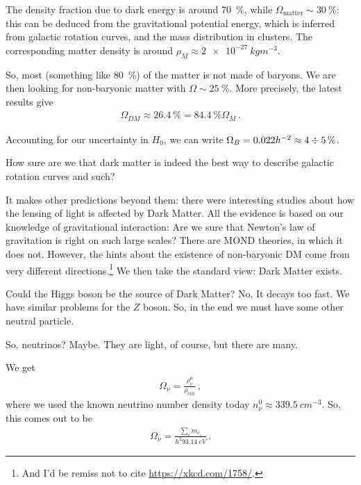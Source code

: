 \documentclass[main.tex]{subfiles}
\begin{document}
The density fraction due to dark energy is around \SI{70}{\percent}, while \(\Omega _{\text{matter}} \sim \SI{30}{\percent}\): this can be deduced from the gravitational potential energy, which is inferred from galactic rotation curves, and the mass distribution in clusters. 
The corresponding matter density is around \(\rho_{M} \approx \SI{2e-27}{kg m^{-3}}\).

So, most (something like \SI{80}{\percent}) of the matter is not made of baryons. 
We are then looking for non-baryonic matter with \(\Omega \sim \SI{25}{\percent}\).
More precisely, the latest results give 
%
\begin{align}
\Omega_{DM} \approx \SI{26.4}{\percent} = \SI{84.4}{\percent} \Omega_{M}
\,.
\end{align}

Accounting for our uncertainty in \(H_0 \), we can write \(\Omega_{B} = \num{.022}h^{-2} \approx 4 \divisionsymbol \SI{5}{\percent}\).

How sure are we that dark matter is indeed the best way to describe galactic rotation curves and such?

It makes other predictions beyond them: there were interesting studies about how the lensing of light is affected by Dark Matter. 
All the evidence is based on our knowledge of gravitational interaction: Are we sure that Newton's law of gravitation is right on such large scales? There are MOND theories, in which it does not.
However, the hints about the existence of non-baryonic DM come from very different directions.\footnote{And I'd be remiss not to cite \url{https://xkcd.com/1758/}.}
We then take the standard view: Dark Matter exists. 

Could the Higgs boson be the source of Dark Matter? No. 
It decays too fast.
We have similar problems for the \(Z\) boson. So, in the end we must have some other neutral particle.

So, neutrinos? Maybe. They are light, of course, but there are many. 

We get 
%
\begin{align}
\Omega_{\nu } = \frac{\rho^{0}_{\nu }}{\rho _{\text{crit}}} 
\,,
\end{align}
%
where we used the known neutrino number density today \(n^{0}_{\nu } \approx \SI{339.5}{cm^{-3}}\).
So, this comes out to be 
%
\begin{align}
\Omega_{\nu } = \frac{ \sum _{i} m_{\nu_{i}}}{h^2 \SI{93.14}{eV}}
\,.
\end{align}
\end{document}
